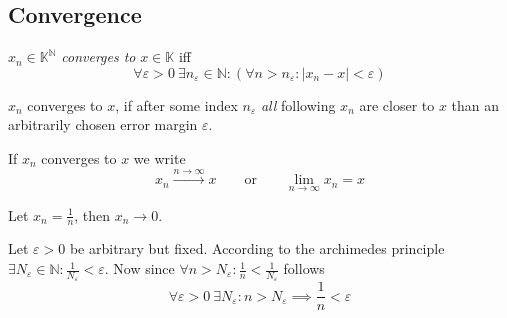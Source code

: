 \subsection{Convergence}
\begin{definition}\label{def:conv_seq}
   \(x_n \in \mathbb{K}^\mathbb{N}\) \emph{converges to} \(x \in \mathbb{K}\) iff
   \[\forall \varepsilon > 0~\exists n_\varepsilon \in \mathbb{N}: (\forall n > n_\varepsilon: |x_n - x| < \varepsilon)\]
\end{definition}
\begin{remark}[Intuition]
   \(x_n\) converges to \(x\), if after some index \(n_\varepsilon\) \emph{all} following \(x_n\) are closer to \(x\) than an arbitrarily chosen error margin \(\varepsilon\).
\end{remark}
\begin{remark}[Notation]
   If \(x_n\) converges to \(x\) we write
   \[x_n \xrightarrow{n \to \infty} x \qquad\text{or}\qquad \lim_{n \to \infty} x_n = x\]
\end{remark}
\begin{example}
   Let \(x_n = \frac{1}{n}\), then \(x_n \to 0\).

   Let \(\varepsilon > 0\) be arbitrary but fixed.
   According to the archimedes principle \(\exists N_\varepsilon \in \mathbb{N}: \frac{1}{N_\varepsilon} < \varepsilon\).
   Now since \(\forall n > N_\varepsilon: \frac{1}{n} < \frac{1}{N_\varepsilon}\) follows
   \[\forall \varepsilon > 0~\exists N_\varepsilon: n > N_\varepsilon \implies \frac{1}{n} < \varepsilon\]

   \begin{center}
      
   \end{center}
\end{example}


